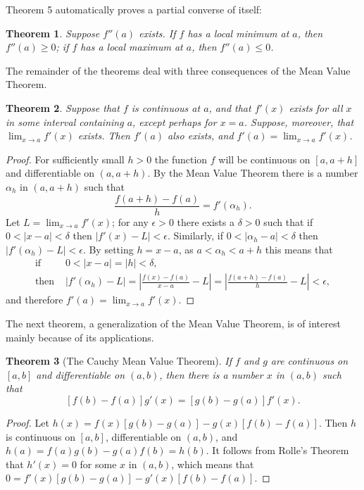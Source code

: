 \documentclass{article}
\numberwithin{corollary}{subsection}
\numberwithin{definition}{subsection}
\numberwithin{lemma}{subsection}
\newtheorem{theorem}{Theorem}
\numberwithin{theorem}{subsection}
\begin{document}
Theorem 5 automatically proves a partial converse of itself:

\begin{theorem}
  Suppose $f''(a)$ exists. If $f$ has a local minimum at $a$, then $f''(a) \geq
  0$; if $f$ has a local maximum at $a$, then $f''(a) \leq 0$.
\end{theorem}

The remainder of the theorems deal with three consequences of the Mean Value
Theorem.

\begin{theorem}
  Suppose that $f$ is continuous at $a$, and that $f'(x)$ exists for all $x$ in
  some interval containing $a$, except perhaps for $x = a$. Suppose, moreover,
  that $\lim_{x \to a} f'(x)$ exists. Then $f'(a)$ also exists, and $f'(a) =
  \lim_{x \to a} f'(x)$.
\end{theorem}

\begin{proof}
  For sufficiently small $h > 0$ the function $f$ will be continuous on
  $[a, a + h]$ and differentiable on $(a, a + h)$. By the Mean Value Theorem
  there is a number $\alpha_h$ in $(a, a + h)$ such that \[
    \frac{f(a + h) - f(a)}{h} = f'(\alpha_h).
  \] Let $L = \lim_{x \to a} f'(x)$; for any $\epsilon > 0$ there exists a
  $\delta > 0$ such that if $0 < |x - a| < \delta$ then $|f'(x) - L| <
  \epsilon$. Similarly, if $0 < |\alpha_h - a| < \delta$ then $|f'(\alpha_h) -
  L| < \epsilon$. By setting $h = x - a$, as $a < \alpha_h < a + h$ this means
  that
  \begin{align*}
    \text{if } &0 < |x - a| = |h| < \delta, \\
    \text{then } &|f'(\alpha_h) - L|
    = \left|\frac{f(x) - f(a)}{x - a} - L\right|
    = \left|\frac{f(a + h) - f(a)}{h} - L\right| < \epsilon,
  \end{align*}
  and therefore $f'(a) = \lim_{x \rightarrow a} f'(x)$.
\end{proof}

The next theorem, a generalization of the Mean Value Theorem, is of interest
mainly because of its applications.

\begin{theorem}[The Cauchy Mean Value Theorem]
  If $f$ and $g$ are continuous on $[a, b]$ and differentiable on $(a, b)$,
  then there is a number $x$ in $(a, b)$ such that \[
    [f(b) - f(a)]g'(x) = [g(b) - g(a)]f'(x).
  \]
\end{theorem}
\begin{proof}
  Let $h(x) = f(x)[g(b) - g(a)] - g(x)[f(b) - f(a)]$. Then $h$ is continuous on
  $[a, b]$, differentiable on $(a, b)$, and $h(a) = f(a)g(b) - g(a)f(b) =
  h(b)$. It follows from Rolle's Theorem that $h'(x) = 0$ for some $x$ in $(a,
  b)$, which means that $0 = f'(x)[g(b) - g(a)] - g'(x)[f(b) - f(a)]$.
\end{proof}
\end{document}
